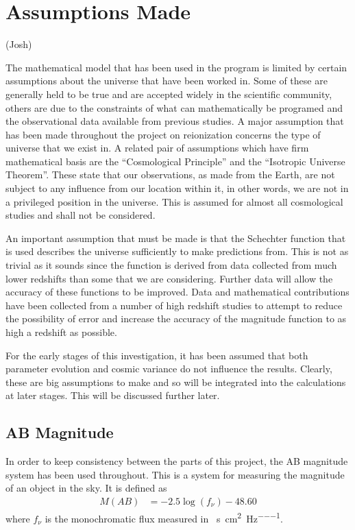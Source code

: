
\section{Assumptions Made} %
\label{sec:assumptions_made}
(Josh)

	The mathematical model that has been used in the program is limited by certain assumptions about the universe that have been worked in. Some of these are generally held to be true and are accepted widely in the scientific community, others are due to the constraints of what can mathematically be programed and the observational data available from previous studies. A major assumption that has been made throughout the project on reionization concerns the type of universe that we exist in. A related pair of assumptions which have firm mathematical basis are the ``Cosmological Principle'' and the ``Isotropic Universe Theorem''. These state that our observations, as made from the Earth, are not subject to any influence from our location within it, in other words, we are not in a privileged position in the universe. This is assumed for almost all cosmological studies and shall not be considered.

	An important assumption that must be made is that the Schechter function that is used describes the universe sufficiently to make predictions from. This is not as trivial as it sounds since the function is derived from data collected from much lower redshifts than some that we are considering. Further data will allow the accuracy of these functions to be improved. Data and mathematical contributions have been collected from a number of high redshift studies to attempt to reduce the possibility of error and increase the accuracy of the magnitude function to as high a redshift as possible.

	For the early stages of this investigation, it has  been assumed that both parameter evolution and cosmic variance do not influence the results. Clearly, these are big assumptions to make and so will be integrated into the calculations at later stages. This will be discussed further later.

	\subsection{AB Magnitude} %
	\label{ssub:ab_magnitude}
		In order to keep consistency between the parts of this project, the AB magnitude system has been used throughout. This is a system for measuring the magnitude of an object in the sky. It is defined as
		\begin{align}
			M(AB) &= -2.5\log(f_\nu) -48.60 \label{eq:ab_magnitude}
		\end{align}
		where $f_\nu$ is the monochromatic flux measured in \si{\erg\per\second\per\square\centi\metre\per\hertz}.

